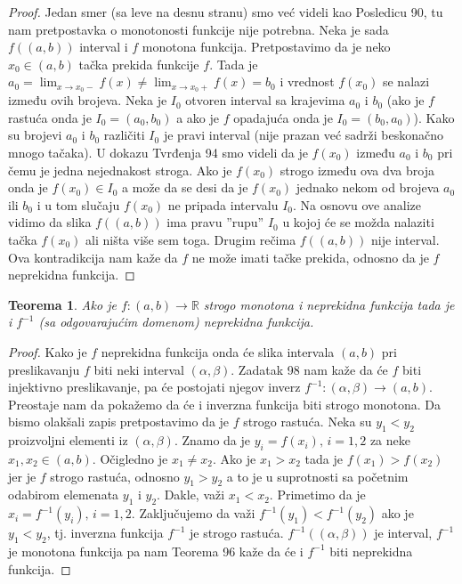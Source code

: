 \documentclass[a4paper,12pt]{article}
\theoremstyle{plain}
\newtheorem{theorem}{Teorema}[section]
\theoremstyle{definition}
\theoremstyle{remark}
\begin{document}
\begin{proof}
Jedan smer (sa leve na desnu stranu) smo već videli kao Posledicu 90, tu nam pretpostavka o monotonosti funkcije nije potrebna. Neka je sada $f((a,b))$ interval i $f$ monotona funkcija. Pretpostavimo da je neko $x_0 \in (a,b)$ tačka prekida funkcije $f$. Tada je $a_0 = \lim_{x \to x_0-} f(x) \neq \lim_{x \to x_0+} f(x) = b_0$ i vrednost $f(x_0)$ se nalazi između ovih brojeva. Neka je $I_0$ otvoren interval sa krajevima $a_0$ i $b_0$ (ako je $f$ rastuća onda je $I_0 = (a_0, b_0)$ a ako je $f$ opadajuća onda je $I_0 = (b_0, a_0)$). Kako su brojevi $a_0$ i $b_0$ različiti $I_0$ je pravi interval (nije prazan već sadrži beskonačno mnogo tačaka). U dokazu Tvrđenja 94 smo videli da je $f(x_0)$ između $a_0$ i $b_0$ pri čemu je jedna nejednakost stroga. Ako je $f(x_0)$ strogo između ova dva broja onda je $f(x_0) \in I_0$ a može da se desi da je $f(x_0)$ jednako nekom od brojeva $a_0$ ili $b_0$ i u tom slučaju $f(x_0)$ ne pripada intervalu $I_0$. Na osnovu ove analize vidimo da slika $f((a,b))$ ima pravu ''rupu'' $I_0$ u kojoj će se možda nalaziti tačka $f(x_0)$ ali ništa više sem toga. Drugim rečima $f((a,b))$ nije interval. Ova kontradikcija nam kaže da $f$ ne može imati tačke prekida, odnosno da je $f$ neprekidna funkcija.
\end{proof}

\begin{theorem}
\label{27-3}
Ako je $f : (a,b) \rightarrow \mathbb{R}$ strogo monotona i neprekidna funkcija tada je i $f^{-1}$ (sa odgovarajućim domenom) neprekidna funkcija.
\end{theorem}

\begin{proof}
Kako je $f$ neprekidna funkcija onda će slika intervala $(a,b)$ pri preslikavanju $f$ biti neki interval $(\alpha, \beta)$. Zadatak 98 nam kaže da će $f$ biti injektivno preslikavanje, pa će postojati njegov inverz $f^{-1} : (\alpha, \beta) \rightarrow (a,b)$. Preostaje nam da pokažemo da će i inverzna funkcija biti strogo monotona. Da bismo olakšali zapis pretpostavimo da je $f$ strogo rastuća. Neka su $y_1 < y_2$ proizvoljni elementi iz $(\alpha, \beta)$. Znamo da je $y_i = f(x_i), \, i = 1,2$ za neke $x_1, x_2 \in (a,b)$. Očigledno je $x_1 \neq x_2$. Ako je $x_1 > x_2$ tada je $f(x_1) > f(x_2)$ jer je $f$ strogo rastuća, odnosno $y_1 > y_2$ a to je u suprotnosti sa početnim odabirom elemenata $y_1$ i $y_2$. Dakle, važi $x_1 < x_2$. Primetimo da je $x_i = f^{-1}(y_i), \, i = 1,2$. Zaključujemo da važi $f^{-1}(y_1) < f^{-1}(y_2)$ ako je $y_1 < y_2$, tj. inverzna funkcija $f^{-1}$ je strogo rastuća. $f^{-1}((\alpha, \beta))$ je interval, $f^{-1}$ je monotona funkcija pa nam Teorema 96 kaže da će i $f^{-1}$ biti neprekidna funkcija.
\end{proof}
\end{document}
